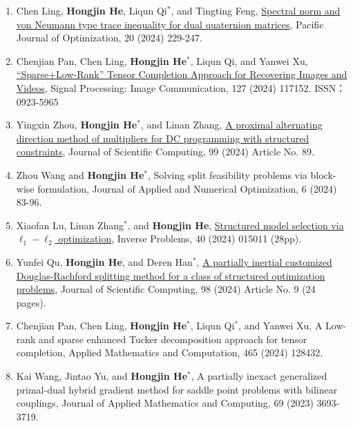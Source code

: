 \begin{enumerate}
	\item Chen Ling, {\bf\color{black}Hongjin He}, Liqun Qi$^*$, and Tingting Feng,  \href{https://doi.org/10.61208/pjo-2023-045}{Spectral norm and von Neumann type trace inequality for dual quaternion matrices}, Pacific Journal of Optimization, 20 (2024) 229-247.
    
    \item Chenjian Pan, Chen Ling, {\bf\color{black} Hongjin He}$^*$, Liqun Qi, and Yanwei Xu, \href{https://doi.org/10.1016/j.image.2024.117152}{“Sparse+Low-Rank” Tensor Completion Approach for Recovering Images and Videos},  Signal Processing: Image Communication, 127 (2024) 117152. ISSN：0923-5965
    
   \item Yingxin Zhou, {\bf \color{black}Hongjin He}$^*$, and Linan Zhang, \href{https://link.springer.com/article/10.1007/s10915-024-02550-0}{\color{blue}A proximal alternating direction method of multipliers for DC programming with structured constraints}, Journal of Scientific Computing, 99 (2024) Article No. 89.
    
    \item Zhou Wang and {\bf\color{black}Hongjin He}$^*$, Solving split feasibility problems via block-wise formulation, Journal of Applied and Numerical Optimization, 6 (2024) 83-96. 
    
     \item Xiaofan Lu, Linan Zhang$^*$, and {\bf\color{black}Hongjin He}, \href{https://iopscience.iop.org/article/10.1088/1361-6420/ad0fad}{\color{blue}Structured model selection via $\ell_1-\ell_2$ optimization}, Inverse Problems, 40 (2024) 015011 (28pp).
    
     \item Yunfei Qu, {\bf\color{black}Hongjin He}, and Deren Han$^*$, \href{https://doi.org/10.1007/s10915-023-02397-x}{\color{blue}A partially inertial customized Douglas-Rachford splitting method for a class of structured optimization problems}, Journal of Scientific Computing, 98 (2024) Article No. 9 (24 pages).
    
     \item Chenjian Pan, Chen Ling, {\bf\color{black}Hongjin He}$^*$, Liqun Qi$^*$, and Yanwei Xu, A Low-rank and sparse enhanced Tucker decomposition approach for tensor completion, Applied Mathematics and Computation, 465 (2024) 128432.
    	 
	\item Kai Wang, Jintao Yu, and {\bf\color{black}Hongjin He}$^*$, A partially inexact generalized primal-dual hybrid gradient method for saddle point problems with bilinear couplings, Journal of Applied Mathematics and Computing, 69 (2023) 3693-3719.
		 

\end{enumerate}
